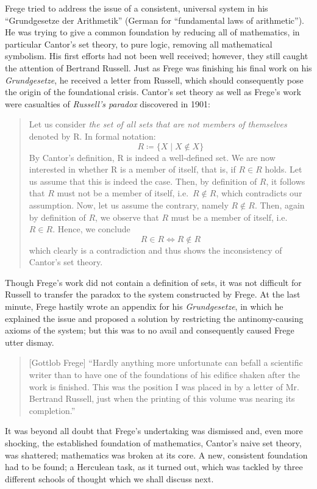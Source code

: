 \documentclass[hidelinks]{article}
\begin{document}
Frege tried to address the issue of a consistent, universal system in his ``Grundgesetze der Arithmetik'' (German for ``fundamental laws of arithmetic''). He was trying to give a common foundation by reducing all of mathematics, in particular Cantor's set theory, to pure logic, removing all mathematical symbolism. His first efforts had not been well received; however, they still caught the attention of Bertrand Russell. Just as Frege was finishing his final work on his \textit{Grundgesetze}, he received a letter from Russell, which should consequently pose the origin of the foundational crisis. Cantor's set theory as well as Frege's work were casualties of \textit{Russell's paradox} discovered in 1901:
\begin{quote}
Let us consider \textit{the set of all sets that are not members of themselves} denoted by R. In formal notation:
\begin{equation*}
	R\coloneqq\{X\mid X\notin X\}
\end{equation*}
By Cantor's definition, R is indeed a well-defined set.
We are now interested in whether R is a member of itself, that is, if $R\in R$ holds.
Let us assume that this is indeed the case. Then, by definition of $R$, it follows that $R$ must not be a member of itself, i.e.\ $R\notin R$, which contradicts our assumption. Now, let us assume the contrary, namely $R\notin R$. Then, again by definition of $R$, we observe that $R$ must be a member of itself, i.e.\ $R\in R$. Hence, we conclude
\begin{equation*}
		R\in R\iff R\notin R
\end{equation*}
which clearly is a contradiction and thus shows the inconsistency of Cantor's set theory.
\end{quote}
Though Frege's work did not contain a definition of sets, it was not difficult for Russell to transfer the paradox to the system constructed by Frege. At the last minute, Frege hastily wrote an appendix for his \textit{Grundgesetze}, in which he explained the issue and proposed a solution by restricting the antinomy-causing axioms of the system; but this was to no avail and consequently caused Frege utter dismay.
\begin{quote}[Gottlob Frege]
``Hardly anything more unfortunate can befall a scientific writer than to have one of the foundations of his edifice shaken after the work is finished. This was the position I was placed in by a letter of Mr. Bertrand Russell, just when the printing of this volume was nearing its completion.''\cite{frege_appendix}
\end{quote}
It was beyond all doubt that Frege's undertaking was dismissed and, even more shocking, the established foundation of mathematics, Cantor's naive set theory, was shattered; mathematics was broken at its core. A new, consistent foundation had to be found; a Herculean task, as it turned out, which was tackled by three different schools of thought which we shall discuss next.
\end{document}
